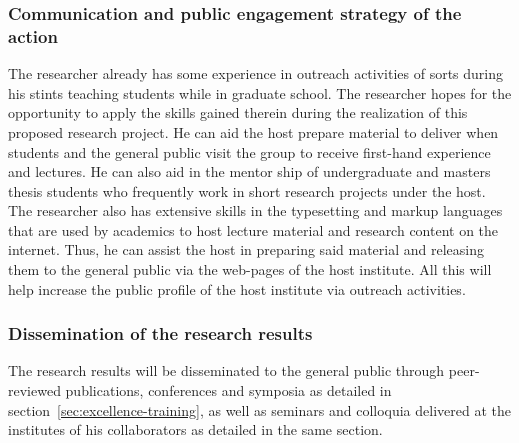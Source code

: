 \documentclass[a4paper,11pt]{article}
\begin{document}
\subsubsection{Communication and public engagement strategy of the
  action}
The researcher already has some experience in outreach activities of sorts during his stints teaching students while in graduate school. The researcher hopes for the opportunity to apply the skills gained therein during the realization of this proposed research project. He can aid the host prepare material to deliver when students and the general public visit the group to receive first-hand experience and lectures. He can also aid in the mentor ship of undergraduate and masters thesis students who frequently work in short research projects under the host. The researcher also has extensive skills in the typesetting and markup languages that are used by academics to host lecture material and research content on the internet. Thus, he can assist the host in preparing said material and releasing them to the general public via the web-pages of the host institute. All this will help increase the public profile of the host institute via outreach activities.
\subsubsection{Dissemination of the research results}
The research results will be disseminated to the general public through peer-reviewed publications, conferences and symposia as detailed in section~\ref{sec:excellence-training}, as well as seminars and colloquia delivered at the institutes of his collaborators as detailed in the same section.
\end{document}
